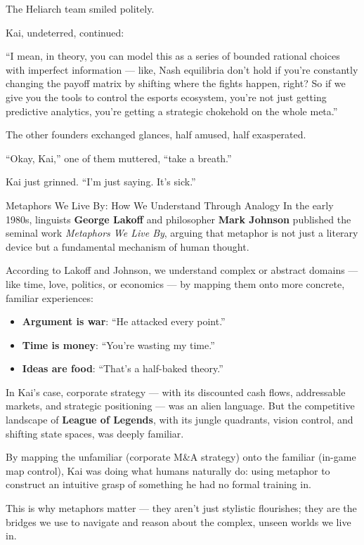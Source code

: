 The Heliarch team smiled politely.

Kai, undeterred, continued:

“I mean, in theory, you can model this as a series of bounded rational choices with imperfect information — like, Nash equilibria don’t hold if you’re constantly changing the payoff matrix by shifting where the fights happen, right? So if we give you the tools to control the esports ecosystem, you’re not just getting predictive analytics, you’re getting a strategic chokehold on the whole meta.”

The other founders exchanged glances, half amused, half exasperated.

“Okay, Kai,” one of them muttered, “take a breath.”

Kai just grinned.
“I’m just saying. It’s sick.”

\begin{HistoricalSidebar}{Metaphors We Live By: How We Understand Through Analogy}
In the early 1980s, linguists \textbf{George Lakoff} and philosopher \textbf{Mark Johnson} published the seminal work \textit{Metaphors We Live By}, arguing that metaphor is not just a literary device but a fundamental mechanism of human thought.

\medskip

According to Lakoff and Johnson, we understand complex or abstract domains — like time, love, politics, or economics — by mapping them onto more concrete, familiar experiences:

\medskip

\begin{itemize}
    \item \textbf{Argument is war}: ``He attacked every point.''  
    \item \textbf{Time is money}: ``You're wasting my time.''
    \item \textbf{Ideas are food}: ``That's a half-baked theory.''
\end{itemize}

\medskip

In Kai's case, corporate strategy — with its discounted cash flows, addressable markets, and strategic positioning — was an alien language.  
But the competitive landscape of \textbf{League of Legends}, with its jungle quadrants, vision control, and shifting state spaces, was deeply familiar.

\medskip

By mapping the unfamiliar (corporate M\&A strategy) onto the familiar (in-game map control), Kai was doing what humans naturally do:  
using metaphor to construct an intuitive grasp of something he had no formal training in.

\medskip

This is why metaphors matter — they aren't just stylistic flourishes; they are the bridges we use to navigate and reason about the complex, unseen worlds we live in.
\end{HistoricalSidebar}
    

